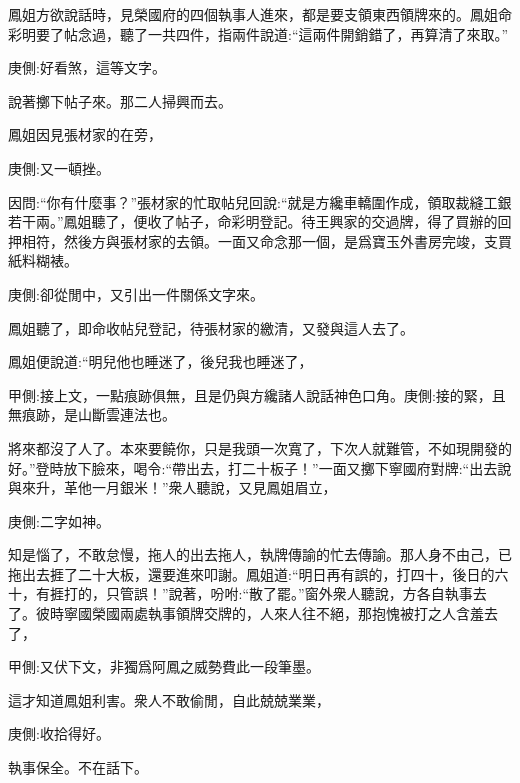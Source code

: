 \begin{parag}
    鳳姐方欲說話時，見榮國府的四個執事人進來，都是要支領東西領牌來的。鳳姐命彩明要了帖念過，聽了一共四件，指兩件說道:“這兩件開銷錯了，再算清了來取。”\begin{note}庚側:好看煞，這等文字。\end{note}說著擲下帖子來。那二人掃興而去。
\end{parag}


\begin{parag}
    鳳姐因見張材家的在旁，\begin{note}庚側:又一頓挫。\end{note}因問:“你有什麼事？”張材家的忙取帖兒回說:“就是方纔車轎圍作成，領取裁縫工銀若干兩。”鳳姐聽了，便收了帖子，命彩明登記。待王興家的交過牌，得了買辦的回押相符，然後方與張材家的去領。一面又命念那一個，是爲寶玉外書房完竣，支買紙料糊裱。\begin{note}庚側:卻從閒中，又引出一件關係文字來。\end{note}鳳姐聽了，即命收帖兒登記，待張材家的繳清，又發與這人去了。
\end{parag}


\begin{parag}
    鳳姐便說道:“明兒他也睡迷了，後兒我也睡迷了，\begin{note}甲側:接上文，一點痕跡俱無，且是仍與方纔諸人說話神色口角。庚側:接的緊，且無痕跡，是山斷雲連法也。\end{note}將來都沒了人了。本來要饒你，只是我頭一次寬了，下次人就難管，不如現開發的好。”登時放下臉來，喝令:“帶出去，打二十板子！”一面又擲下寧國府對牌:“出去說與來升，革他一月銀米！”衆人聽說，又見鳳姐眉立，\begin{note}庚側:二字如神。\end{note}知是惱了，不敢怠慢，拖人的出去拖人，執牌傳諭的忙去傳諭。那人身不由己，已拖出去捱了二十大板，還要進來叩謝。鳳姐道:“明日再有誤的，打四十，後日的六十，有捱打的，只管誤！”說著，吩咐:“散了罷。”窗外衆人聽說，方各自執事去了。彼時寧國榮國兩處執事領牌交牌的，人來人往不絕，那抱愧被打之人含羞去了，\begin{note}甲側:又伏下文，非獨爲阿鳳之威勢費此一段筆墨。\end{note}這才知道鳳姐利害。衆人不敢偷閒，自此兢兢業業，\begin{note}庚側:收拾得好。\end{note}執事保全。不在話下。
\end{parag}


